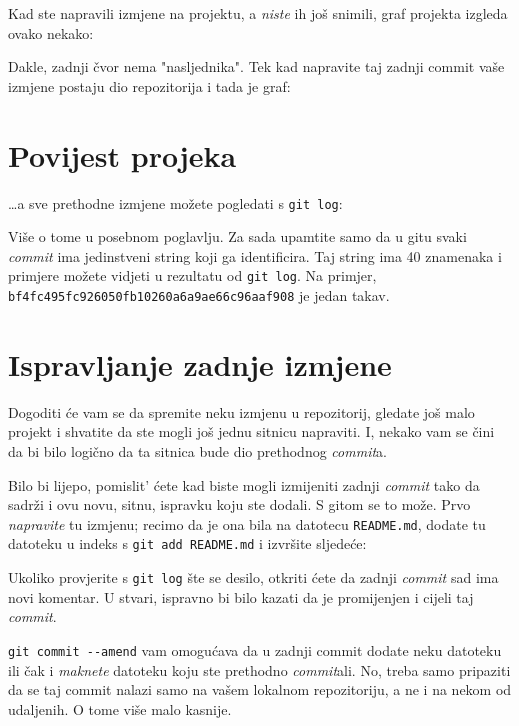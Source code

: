Kad ste napravili izmjene na projektu, a \emph{niste} ih još snimili, graf projekta izgleda ovako nekako:



Dakle, zadnji čvor nema "nasljednika".
Tek kad napravite taj zadnji commit vaše izmjene postaju dio repozitorija i tada je graf:



\section*{Povijest projeka}

\dots{}a sve prethodne izmjene možete pogledati s \verb+git log+:



Više o tome u posebnom poglavlju. 
Za sada upamtite samo da u gitu svaki \emph{commit} ima jedinstveni string koji ga identificira.
Taj string ima 40 znamenaka i primjere možete vidjeti u rezultatu od \verb+git log+.
Na primjer, \verb+bf4fc495fc926050fb10260a6a9ae66c96aaf908+ je jedan takav.

\section*{Ispravljanje zadnje izmjene}

Dogoditi će vam se da spremite neku izmjenu u repozitorij, gledate još malo projekt i shvatite da ste mogli još jednu sitnicu napraviti.
I, nekako vam se čini da bi bilo logično da ta sitnica bude dio prethodnog \emph{commit}a.

Bilo bi lijepo, pomislit' ćete kad biste mogli izmijeniti zadnji \emph{commit} tako da sadrži i ovu novu, sitnu, ispravku koju ste dodali.
S gitom se to može.
Prvo \emph{napravite} tu izmjenu; recimo da je ona bila na datotecu \verb+README.md+, dodate tu datoteku u indeks s \verb+git add README.md+ i izvršite sljedeće:


Ukoliko provjerite s \verb+git log+ šte se desilo, otkriti ćete da zadnji \emph{commit} sad ima novi komentar.
U stvari, ispravno bi bilo kazati da je promijenjen i cijeli taj \emph{commit}.

\verb+git commit --amend+ vam omogućava da u zadnji commit dodate neku datoteku ili čak i \emph{maknete} datoteku koju ste prethodno \emph{commit}ali. 
No, treba samo pripaziti da se taj commit nalazi samo na vašem lokalnom repozitoriju, a ne i na nekom od udaljenih. 
O tome više malo kasnije.

